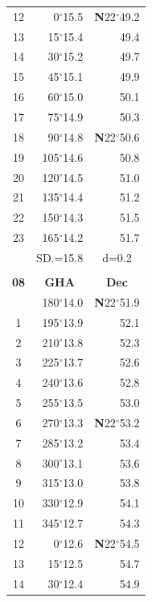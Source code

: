 \documentclass[10pt, a4paper]{report}
\begin{document}
\begin{scriptsize}
\begin{tabular*}{0.2\textwidth}[t]{@{\extracolsep{\fill}}|c|rr|}
12 & 0$^\circ$15.5 & \textbf{N}22$^\circ$49.2\\
13 & 15$^\circ$15.4 & 49.4\\
14 & 30$^\circ$15.2 & 49.7\\
15 & 45$^\circ$15.1 & \raisebox{0.24ex}{\boldmath$\cdot$~\boldmath$\cdot$~~}49.9\\
16 & 60$^\circ$15.0 & 50.1\\
17 & 75$^\circ$14.9 & 50.3\\[2Pt]
18 & 90$^\circ$14.8 & \textbf{N}22$^\circ$50.6\\
19 & 105$^\circ$14.6 & 50.8\\
20 & 120$^\circ$14.5 & 51.0\\
21 & 135$^\circ$14.4 & \raisebox{0.24ex}{\boldmath$\cdot$~\boldmath$\cdot$~~}51.2\\
22 & 150$^\circ$14.3 & 51.5\\
23 & 165$^\circ$14.2 & 51.7\\
\hline
\rule{0pt}{2.4ex} & \multicolumn{1}{c}{SD.=15.8} & \multicolumn{1}{c|}{d=0.2}\\
\hline
\multicolumn{1}{c}{}\\[-0.5ex]\hline
\multicolumn{1}{|c|}{\rule{0pt}{2.6ex}\textbf{08}} & \multicolumn{1}{c}{\textbf{GHA}} & \multicolumn{1}{c|}{\textbf{Dec}}\\
\hline\rule{0pt}{2.6ex}\noindent
0 & 180$^\circ$14.0 & \textbf{N}22$^\circ$51.9\\
1 & 195$^\circ$13.9 & 52.1\\
2 & 210$^\circ$13.8 & 52.3\\
3 & 225$^\circ$13.7 & \raisebox{0.24ex}{\boldmath$\cdot$~\boldmath$\cdot$~~}52.6\\
4 & 240$^\circ$13.6 & 52.8\\
5 & 255$^\circ$13.5 & 53.0\\[2Pt]
6 & 270$^\circ$13.3 & \textbf{N}22$^\circ$53.2\\
7 & 285$^\circ$13.2 & 53.4\\
8 & 300$^\circ$13.1 & 53.6\\
9 & 315$^\circ$13.0 & \raisebox{0.24ex}{\boldmath$\cdot$~\boldmath$\cdot$~~}53.8\\
10 & 330$^\circ$12.9 & 54.1\\
11 & 345$^\circ$12.7 & 54.3\\[2Pt]
12 & 0$^\circ$12.6 & \textbf{N}22$^\circ$54.5\\
13 & 15$^\circ$12.5 & 54.7\\
14 & 30$^\circ$12.4 & 54.9\\

\end{tabular*}
\end{scriptsize}
\end{document}
